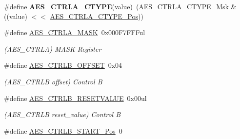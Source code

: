 \begin{DoxyCompactItemize}
\item 
\hypertarget{group___s_a_m_l21___a_e_s_gae72968b666f5988d628485feb0655879}{}\#define {\bfseries A\+E\+S\+\_\+\+C\+T\+R\+L\+A\+\_\+\+C\+T\+Y\+P\+E}(value)~(A\+E\+S\+\_\+\+C\+T\+R\+L\+A\+\_\+\+C\+T\+Y\+P\+E\+\_\+\+Msk \& ((value) $<$$<$ \hyperlink{group___s_a_m_l21___a_e_s_ga0bfd0c90e0ee148b5a49d5d732a88caa}{A\+E\+S\+\_\+\+C\+T\+R\+L\+A\+\_\+\+C\+T\+Y\+P\+E\+\_\+\+Pos}))\label{group___s_a_m_l21___a_e_s_gae72968b666f5988d628485feb0655879}

\item 
\hypertarget{group___s_a_m_l21___a_e_s_gad3d6155566850d559b4d5beb3da78125}{}\#define \hyperlink{group___s_a_m_l21___a_e_s_gad3d6155566850d559b4d5beb3da78125}{A\+E\+S\+\_\+\+C\+T\+R\+L\+A\+\_\+\+M\+A\+S\+K}~0x000\+F7\+F\+F\+Ful\label{group___s_a_m_l21___a_e_s_gad3d6155566850d559b4d5beb3da78125}

\begin{DoxyCompactList}\small\item\em (A\+E\+S\+\_\+\+C\+T\+R\+L\+A) M\+A\+S\+K Register \end{DoxyCompactList}\item 
\hypertarget{group___s_a_m_l21___a_e_s_ga2f786e95894df5f05ff890a6748b7407}{}\#define \hyperlink{group___s_a_m_l21___a_e_s_ga2f786e95894df5f05ff890a6748b7407}{A\+E\+S\+\_\+\+C\+T\+R\+L\+B\+\_\+\+O\+F\+F\+S\+E\+T}~0x04\label{group___s_a_m_l21___a_e_s_ga2f786e95894df5f05ff890a6748b7407}

\begin{DoxyCompactList}\small\item\em (A\+E\+S\+\_\+\+C\+T\+R\+L\+B offset) Control B \end{DoxyCompactList}\item 
\hypertarget{group___s_a_m_l21___a_e_s_gae33dc747714673fa684e0b0775460cf2}{}\#define \hyperlink{group___s_a_m_l21___a_e_s_gae33dc747714673fa684e0b0775460cf2}{A\+E\+S\+\_\+\+C\+T\+R\+L\+B\+\_\+\+R\+E\+S\+E\+T\+V\+A\+L\+U\+E}~0x00ul\label{group___s_a_m_l21___a_e_s_gae33dc747714673fa684e0b0775460cf2}

\begin{DoxyCompactList}\small\item\em (A\+E\+S\+\_\+\+C\+T\+R\+L\+B reset\+\_\+value) Control B \end{DoxyCompactList}\item 
\hypertarget{group___s_a_m_l21___a_e_s_ga5cef25ba4d85f57f405363a1d79fc7cd}{}\#define \hyperlink{group___s_a_m_l21___a_e_s_ga5cef25ba4d85f57f405363a1d79fc7cd}{A\+E\+S\+\_\+\+C\+T\+R\+L\+B\+\_\+\+S\+T\+A\+R\+T\+\_\+\+Pos}~0\label{group___s_a_m_l21___a_e_s_ga5cef25ba4d85f57f405363a1d79fc7cd}


\end{DoxyCompactItemize}
